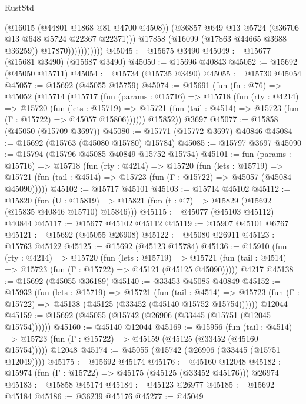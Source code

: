 \begin{lexlean}{RustStd}
\begin{coremodule}
                            (@16015 (@44801 @1868 @81 @4700 @4508))
                            (@36857 @649 @13 @5724 (@36706 @13 @648 @5724 @22367 @22371)))
                          @17858
                          (@16099 (@17863 @44665 @3688 @36259))
                          @17870)))))))))))
@45045 := @15675 @3490
@45049 := @15677 (@15681 @3490) (@15687 @3490)
@45050 := @15696 @40843
@45052 := @15692 (@45050 @15711)
@45054 := @15734 (@15735 @3490)
@45055 := @15730 @45054
@45057 := @15692 (@45055 @15759)
@45074 := @15691
    (fun (fn : @76) =>
    @45052
      (@15714
        (@15717
          (fun (params : @15716) =>
          @15718
            (fun (rty : @4214) =>
            @15720
              (fun (lets : @15719) =>
              @15721 (fun (tail : @4514) => @15723 (fun (Γ : @15722) => @45057 @15806))))))
        @15852))
    @3697
@45077 := @15858 (@45050 (@15709 @3697))
@45080 := @15771 (@15772 @3697) @40846
@45084 := @15692 (@15763 (@45080 @15780) @15784)
@45085 := @15797 @3697
@45090 := @15794 (@15796 @45085 @40849 @15752 @15754)
@45101 := fun (params : @15716) =>
  @15718
    (fun (rty : @4214) =>
    @15720
      (fun (lets : @15719) =>
      @15721 (fun (tail : @4514) => @15723 (fun (Γ : @15722) => @45057 (@45084 @45090)))))
@45102 := @15717 @45101
@45103 := @15714 @45102
@45112 := @15820
    (fun (U : @15819) => @15821 (fun (t : @7) => @15829 (@15692 (@15835 @40846 @15710) @15846)))
@45115 := @45077 (@45103 @45112) @40844
@45117 := @15677 @45102 @45112
@45119 := @15907 @45101 @6767
@45121 := @15692 (@45055 @26908)
@45122 := @45080 @26911
@45123 := @15763 @45122
@45125 := @15692 (@45123 @15784)
@45136 := @15910
    (fun (rty : @4214) =>
    @15720
      (fun (lets : @15719) =>
      @15721 (fun (tail : @4514) => @15723 (fun (Γ : @15722) => @45121 (@45125 @45090)))))
    @4217
@45138 := @15692 (@45055 @36189)
@45140 := @33453 @45085 @40849
@45152 := @15932
    (fun (lets : @15719) =>
    @15721
      (fun (tail : @4514) =>
      @15723 (fun (Γ : @15722) => @45138 (@45125 (@33452 (@45140 @15752 @15754))))))
    @12044
@45159 := @15692 (@45055 (@15742 (@26906 (@33445 (@15751 (@12045 @15754))))))
@45160 := @45140 @12044
@45169 := @15956
    (fun (tail : @4514) => @15723 (fun (Γ : @15722) => @45159 (@45125 (@33452 (@45160 @15754)))))
    @12048
@45174 := @45055 (@15742 (@26906 (@33445 (@15751 @12049))))
@45175 := @15692 @45174
@45176 := @45160 @12048
@45182 := @15974 (fun (Γ : @15722) => @45175 (@45125 (@33452 @45176))) @26974
@45183 := @15858 @45174
@45184 := @45123 @26977
@45185 := @15692 @45184
@45186 := @36239 @45176
@45277 := @45049

\end{coremodule}
\end{lexlean}
